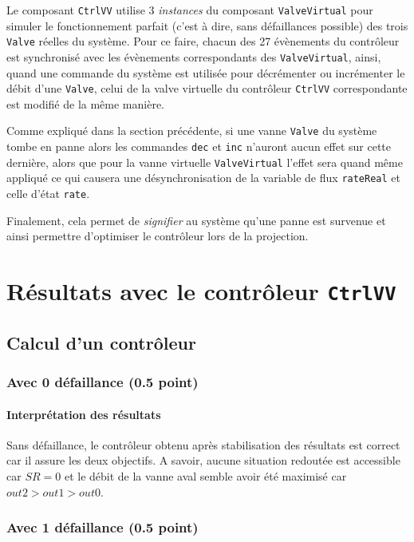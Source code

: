 \documentclass[a4paper]{book}
\begin{document}
Le composant \texttt{CtrlVV} utilise 3 \textit{instances} du composant
\texttt{ValveVirtual} pour simuler le fonctionnement parfait (c'est à dire,
sans défaillances possible) des trois \texttt{Valve} réelles du système. Pour
ce faire, chacun des 27 évènements du contrôleur est synchronisé avec les
évènements correspondants des \texttt{ValveVirtual}, ainsi, quand une commande
du système est utilisée pour décrémenter ou incrémenter le débit d'une
\texttt{Valve}, celui de la valve virtuelle du contrôleur \texttt{CtrlVV}
correspondante est modifié de la même manière.

Comme expliqué dans la section précédente, si une vanne \texttt{Valve} du système
tombe en panne alors les commandes \texttt{dec} et \texttt{inc} n'auront aucun effet sur cette
dernière, alors que pour la vanne virtuelle \texttt{ValveVirtual} l'effet sera
quand même appliqué ce qui causera une désynchronisation de la variable de flux
\texttt{rateReal} et celle d'état \texttt{rate}.

Finalement, cela permet de \textit{signifier} au système qu'une panne est
survenue et ainsi permettre d'optimiser le contrôleur lors de la projection.

\section{Résultats avec le contrôleur {\tt CtrlVV}}
\subsection{Calcul d'un contrôleur}
\subsubsection{Avec 0 défaillance (0.5 point)}

\paragraph{Interprétation des résultats}

Sans défaillance, le contrôleur obtenu après stabilisation des résultats est
correct car il assure les deux objectifs. A savoir, aucune situation redoutée
est accessible car $SR = 0$ et le débit de la vanne aval semble avoir été
maximisé car $out2 > out1 > out0$.

\subsubsection{Avec 1 défaillance (0.5 point)}

\end{document}
